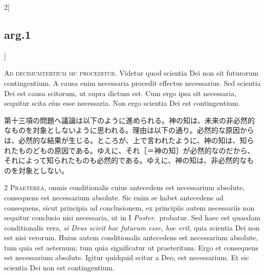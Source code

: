 \documentclass[paper=a4paper,fontsize=10pt,jafontsize=9pt,titlepage]{jlreq}
\begin{document}
\begin{paracol}{2}[\subsection{arg.1}]

{\huge A}{\scshape d decimumtertium sic proceditur}. Videtur quod
scientia Dei non sit futurorum contingentium. A causa enim necessaria
procedit effectus necessarius. Sed scientia Dei est causa scitorum, ut
supra dictum est. Cum ergo ipsa sit necessaria, sequitur scita eius
esse necessaria. Non ergo scientia Dei est contingentium.

\switchcolumn

第十三項の問題へ議論は以下のように進められる。神の知は、未来の非必然的
なものを対象としないように思われる。理由は以下の通り。必然的な原因から
は、必然的な結果が生じる。ところが、上で言われたように、神の知は、知ら
れたものどもの原因である。ゆえに、それ［＝神の知］が必然的なのだから、
それによって知られたものも必然的である。ゆえに、神の知は、非必然的なも
のを対象としない。

\switchcolumn*

2 {\scshape Praeterea}, omnis conditionalis cuius antecedens est
necessarium absolute, consequens est necessarium absolute. Sic enim se
habet antecedens ad consequens, sicut principia ad conclusionem, ex
principiis autem necessariis non sequitur conclusio nisi necessaria,
ut in I {\itshape Poster}.~probatur. Sed haec est quaedam
conditionalis vera, {\itshape si Deus scivit hoc futurum esse, hoc
erit}, quia scientia Dei non est nisi verorum. Huius autem
conditionalis antecedens est necessarium absolute, tum quia est
aeternum; tum quia significatur ut praeteritum. Ergo et consequens est
necessarium absolute. Igitur quidquid scitur a Deo, est
necessarium. Et sic scientia Dei non est contingentium.

\switchcolumn


\end{paracol}
\end{document}
